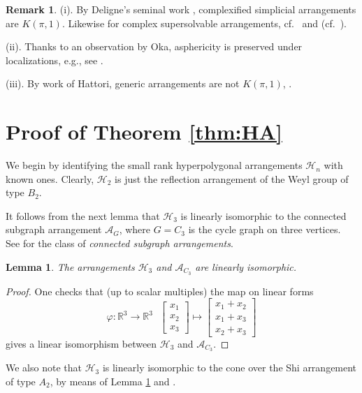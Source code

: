 \documentclass[12pt]{amsart}
\newcommand\CA{{\mathscr A}}
\newcommand\CH{{\mathscr H}}
\newcommand\BBR{{\mathbb R}}
\numberwithin{equation}{section}
\theoremstyle{plain}
\newtheorem{lemma}[equation]{Lemma}
\theoremstyle{definition}
\newtheorem{remark}[equation]{Remark}
\begin{document}
\begin{remark}
	\label{rem:kpione}
	(i). 
	By Deligne's seminal work \cite{deligne}, complexified simplicial arrangements are $K(\pi, 1)$.
	Likewise for complex supersolvable arrangements, cf.~\cite{falkrandell:fiber-type} and \cite{terao:modular} (cf.~\cite[Prop.\ 5.12, Thm.~5.113]{orlikterao:arrangements}).
	
	(ii).
	Thanks to an observation by Oka,
	asphericity is preserved under localizations,
	e.g., see \cite[Lem.~1.1]{paris:deligne}.
	
	(iii).
		By work of Hattori, 
	generic arrangements are not $K(\pi, 1)$, \cite[Cor.~5.23]{orlikterao:arrangements}.
\end{remark}

\section{Proof of Theorem \ref{thm:HA}}
\label{s:thm:kpi1}
We begin by identifying the small rank hyperpolygonal arrangements $\CH_n$ with known ones.
Clearly, $\CH_2$ is just the reflection arrangement of the Weyl group of type $B_2$.

It follows from the next lemma that 
$\CH_3$ is linearly isomorphic to the connected subgraph arrangement $\CA_G$, where $G = C_3$ is the cycle graph on three vertices. 
See \cite{cuntzkuehne:subgraphs} for the class of 
\emph{connected subgraph arrangements}. 

\begin{lemma}
	\label{lem:H3}
	The arrangements $\CH_3$ and $\CA_{C_3}$ are linearly isomorphic.
\end{lemma}

\begin{proof}
	One checks that  (up to scalar multiples) the map on linear forms 
	$$\varphi: \BBR^3 \rightarrow \BBR^3 \ \ \ \begin{bmatrix} x_1 \\ x_2 \\ x_3 \end{bmatrix} \mapsto \begin{bmatrix} x_1+x_2 \\ x_1+x_3 \\ x_2+x_3 \end{bmatrix}$$
	gives a linear isomorphism between $\CH_3$ and $\CA_{C_3}$.
\end{proof}

We also note that $\CH_3$ is linearly isomorphic to the cone over the Shi arrangement of type  $A_2$,  by means of Lemma \ref{lem:H3} and 
\cite[Prop.~3.1]{cuntzkuehne:subgraphs}.
\end{document}
